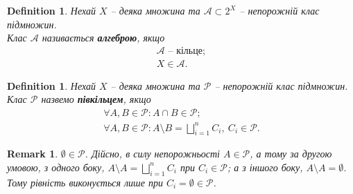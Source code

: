 \documentclass[a4paper, 10pt]{article}
\theoremstyle{theoremdd}
\newtheorem{definition}[theorem]{Definition}
\newtheorem{remark}[theorem]{Remark}
\begin{document}
\begin{definition}
Нехай $X$ -- деяка множина та $\mathcal{A} \subset 2^X$ -- непорожній клас підмножин.\\
Клас $\mathcal{A}$ називається \textbf{алгеброю}, якщо
\begin{align*}
\mathcal{A} \text{ -- кільце}; \\
X \in \mathcal{A}.
\end{align*}
\end{definition}

\begin{definition}
Нехай $X$ -- деяка множина та $\mathcal{P}$ -- непорожній клас підмножин.\\
Клас $\mathcal{P}$ назвемо \textbf{півкільцем}, якщо
\begin{align*}
\forall A,B \in \mathcal{P}: A \cap B \in \mathcal{P}; \\
\forall A,B \in \mathcal{P}: A \setminus B = \bigsqcup_{i=1}^n C_i,\ C_i \in \mathcal{P}.
\end{align*}
\end{definition}

\begin{remark}
$\emptyset \in \mathcal{P}$. 
Дійсно, в силу непорожньості $A \in \mathcal{P}$, а тому за другою умовою, з одного боку, $A \setminus A = \displaystyle\bigsqcup_{i=1}^n C_i$ при $C_i \in \mathcal{P}$; а з іншого боку, $A \setminus A = \emptyset$. Тому рівність виконується лише при $C_i = \emptyset \in \mathcal{P}$.
\end{remark}
\end{document}

